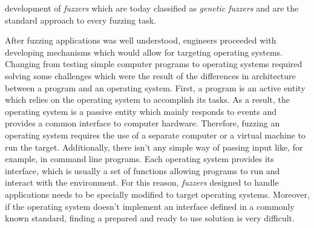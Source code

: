 development of \textit{fuzzers} which are today classified as \textit{genetic fuzzers} and are the standard approach to every fuzzing task. 

After fuzzing applications was well understood, engineers proceeded with developing mechanisms which would allow for targeting operating systems. Changing from testing simple computer programs to operating systems required solving some challenges which were the result of the differences in architecture between a program and an operating system. First, a program is an active entity which relies on the operating system to accomplish its tasks. As a result, the operating system is a passive entity which mainly responds to events and provides a common interface to computer hardware. Therefore, fuzzing an operating system requires the use of a separate computer or a virtual machine to run the target. Additionally, there isn't any simple way of passing input like, for example, in command line programs. Each operating system provides its interface, which is usually a set of functions allowing programs to run and interact with the environment. For this reason, \textit{fuzzers} designed to handle applications needs to be specially modified to target operating systems. Moreover, if the operating system doesn't implement an interface defined in a commonly known standard, finding a prepared and ready to use solution is very difficult.


